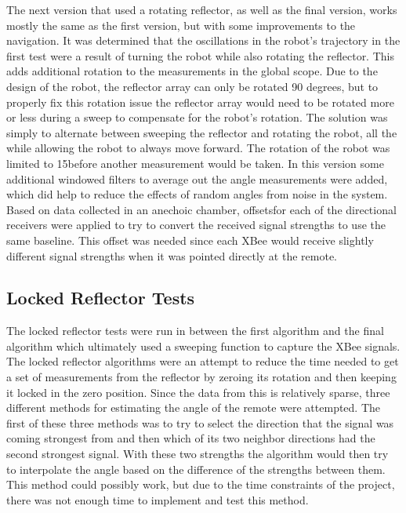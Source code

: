 \vspace*{12pt}
\noindent
The next version that used a rotating reflector, as well as the final version, works mostly the same as the first version, but with some improvements to the navigation. It was determined that the oscillations in the robot's trajectory in the first test were a result of turning the robot while also rotating the reflector. This adds additional rotation to the measurements in the global scope. Due to the design of the robot, the reflector array can only be rotated 90 degrees, but to properly fix this rotation issue the reflector array would need to be rotated more or less during a sweep to compensate for the robot's rotation. The solution was simply to alternate between sweeping the reflector and rotating the robot, all the while allowing the robot to always move forward. The rotation of the robot was limited to 15\textdegree before another measurement would be taken. In this version some additional windowed filters to average out the angle measurements were added, which did help to reduce the effects of random angles from noise in the system. Based on data collected in an anechoic chamber, offsetsfor each of the directional receivers were applied to try to convert the received signal strengths to use the same baseline. This offset was needed since each XBee would receive slightly different signal strengths when it was pointed directly at the remote.

\subsection{Locked Reflector Tests}

The locked reflector tests were run in between the first algorithm and the final algorithm which ultimately used a sweeping function to capture the XBee signals. The locked reflector algorithms were an attempt to reduce the time needed to get a set of measurements from the reflector by zeroing its rotation and then keeping it locked in the zero position. Since the data from this is relatively sparse, three different methods for estimating the angle of the remote were attempted. The first of these three methods was to try to select the direction that the signal was coming strongest from and then which of its two neighbor directions had the second strongest signal. With these two strengths the algorithm would then try to interpolate the angle based on the difference of the strengths between them. This method could possibly work, but due to the time constraints of the project, there was not enough time to implement and test this method.

